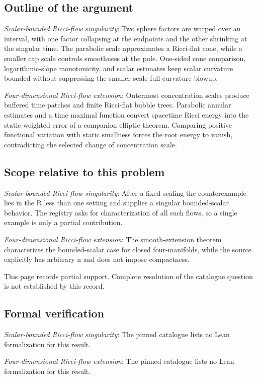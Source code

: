 \documentclass[11pt]{article}
\begin{document}
\subsection{Outline of the argument}
\textit{Scalar-bounded Ricci-flow singularity}: Two sphere factors are warped over an interval, with one factor collapsing at the endpoints and the other shrinking at the singular time. The parabolic scale approximates a Ricci-flat cone, while a smaller cap scale controls smoothness at the pole. One-sided cone comparison, logarithmic-slope monotonicity, and scalar estimates keep scalar curvature bounded without suppressing the smaller-scale full-curvature blowup.

\textit{Four-dimensional Ricci-flow extension}: Outermost concentration scales produce buffered time patches and finite Ricci-flat bubble trees. Parabolic annular estimates and a time maximal function convert spacetime Ricci energy into the static weighted error of a companion elliptic theorem. Comparing positive functional variation with static smallness forces the root energy to vanish, contradicting the selected change of concentration scale.

\subsection{Scope relative to this problem}
\textit{Scalar-bounded Ricci-flow singularity}: After a fixed scaling the counterexample lies in the R less than one setting and supplies a singular bounded-scalar behavior. The registry asks for characterization of all such flows, so a single example is only a partial contribution.

\textit{Four-dimensional Ricci-flow extension}: The smooth-extension theorem characterizes the bounded-scalar case for closed four-manifolds, while the source explicitly has arbitrary n and does not impose compactness.

This page records partial support. Complete resolution of the catalogue question is not established by this record.

\subsection{Formal verification}
\textit{Scalar-bounded Ricci-flow singularity}: The pinned catalogue lists no Lean formalization for this result.

\textit{Four-dimensional Ricci-flow extension}: The pinned catalogue lists no Lean formalization for this result.
\end{document}
